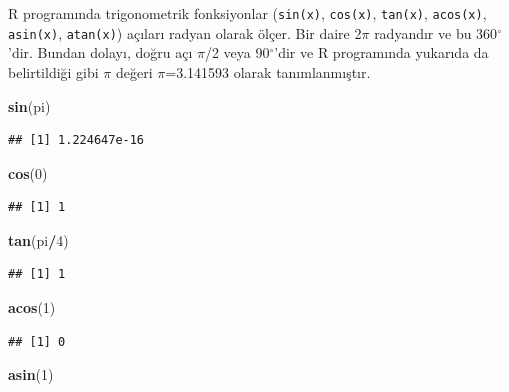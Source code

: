\documentclass[
]{book}
\newenvironment{Shaded}{\begin{snugshade}}{\end{snugshade}}
\newcommand{\DecValTok}[1]{\textcolor[rgb]{0.00,0.00,0.81}{#1}}
\newcommand{\FunctionTok}[1]{\textcolor[rgb]{0.13,0.29,0.53}{\textbf{#1}}}
\newcommand{\NormalTok}[1]{#1}
\newcommand{\SpecialCharTok}[1]{\textcolor[rgb]{0.81,0.36,0.00}{\textbf{#1}}}
\begin{document}
R programında trigonometrik fonksiyonlar (\texttt{sin(x)}, \texttt{cos(x)}, \texttt{tan(x)}, \texttt{acos(x)}, \texttt{asin(x)}, \texttt{atan(x)}) açıları radyan olarak ölçer. Bir daire 2\(\pi\) radyandır ve bu 360\(^\circ\)'dir. Bundan dolayı, doğru açı \(\pi\)/2 veya 90\(^\circ\)'dir ve R programında yukarıda da belirtildiği gibi \(\pi\) değeri \(\pi\)=3.141593 olarak tanımlanmıştır.

\begin{Shaded}
\begin{Highlighting}[]
\FunctionTok{sin}\NormalTok{(pi)}
\end{Highlighting}
\end{Shaded}

\begin{verbatim}
## [1] 1.224647e-16
\end{verbatim}

\begin{Shaded}
\begin{Highlighting}[]
\FunctionTok{cos}\NormalTok{(}\DecValTok{0}\NormalTok{)}
\end{Highlighting}
\end{Shaded}

\begin{verbatim}
## [1] 1
\end{verbatim}

\begin{Shaded}
\begin{Highlighting}[]
\FunctionTok{tan}\NormalTok{(pi}\SpecialCharTok{/}\DecValTok{4}\NormalTok{)}
\end{Highlighting}
\end{Shaded}

\begin{verbatim}
## [1] 1
\end{verbatim}

\begin{Shaded}
\begin{Highlighting}[]
\FunctionTok{acos}\NormalTok{(}\DecValTok{1}\NormalTok{)}
\end{Highlighting}
\end{Shaded}

\begin{verbatim}
## [1] 0
\end{verbatim}

\begin{Shaded}
\begin{Highlighting}[]
\FunctionTok{asin}\NormalTok{(}\DecValTok{1}\NormalTok{)}
\end{Highlighting}
\end{Shaded}
\end{document}
